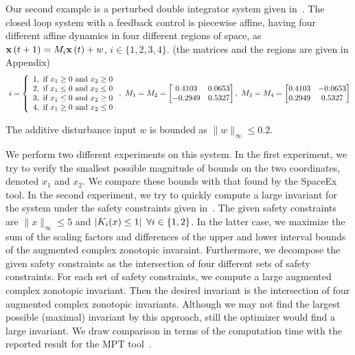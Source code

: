 Our second example is a perturbed double integrator system given
in~\cite{rakovic2004computation}.  The closed loop system with a
feedback control is piecewise affine, having four different affine
dynamics in four different regions of space, as
${\bf x}\left(t+1\right)=M_i{\bf x}\left(t\right)+w$, $i\in\{1,2,3,4\}$.  (the matrices and the regions are given in Appendix)
{\scriptsize
\begin{align*}~\label{eqn:pwa-regions}
i=\left\{\begin{array}{l}
1,~\text{if}~x_1\geq 0~\text{and}~x_2\geq 0\\
2,~\text{if}~x_1\leq 0~\text{and}~x_2\leq 0\\
3,~\text{if}~x_1\leq 0~\text{and}~x_2\geq 0\\
4,~\text{if}~x_1\geq 0~\text{and}~x_2\leq 0\\
\end{array} \right.,
~M_1=M_2=\left[\begin{matrix}
0.4103  &  0.0653\\
  -0.2949  &  0.5327
\end{matrix}\right],~M_3=M_4=\left[\begin{matrix}
0.4103  &  -0.0653\\
  0.2949  &  0.5327
\end{matrix}\right]
\end{align*}}

The additive disturbance input $w$ is bounded as $\|w\|_{\infty}\leq
0.2$.  

We perform two different experiments on this system.  In the first
experiment, we try to verify the smallest possible magnitude of bounds
on the two coordinates, denoted $x_1$ and $x_2$. We compare these
bounds with that found by the SpaceEx tool.  In the second experiment,
we try to quickly compute a large invariant for the system under the
safety constraints given in~\cite{rakovic2004computation}.  The given
safety constraints are $\|x\|_{\infty}\leq 5$ and $\left|K_i(x)\leq
1\right|~\forall i\in\left\{1,2\right\}$.  In the latter case, we maximize the
sum of the scaling factors and differences of the upper and lower
interval bounds of the augmented complex zonotopic invaraint.
Furthermore, we decompose the given safety constraints as the
intersection of four different sets of safety constraints.  For each
set of safety constraints, we compute a large augmented complex
zonotopic invariant.  Then the desired invariant is the intersection
of four augmented complex zonotopic invariants.  Although we may not
find the largest possible (maximal) invariant by this approach, still
the optimizer would find a large invariant.  We draw comparison in
terms of the computation time with the reported result for the MPT
tool~\cite{rakovic2004computation}.

